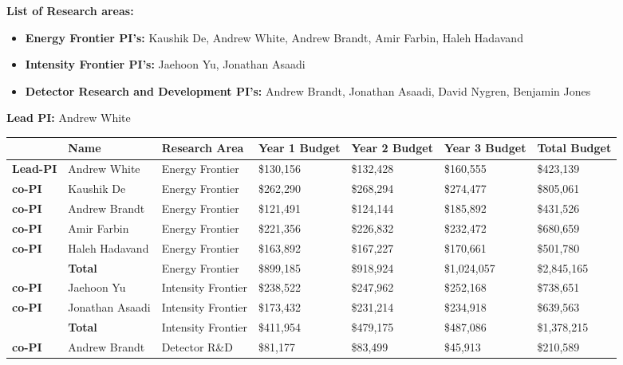 \noindent\textbf{List of Research areas:}
\begin{itemize}[noitemsep,nolistsep]
   \item \textbf{Energy Frontier PI's:} Kaushik De, Andrew White, Andrew Brandt, Amir Farbin, Haleh Hadavand
	\item \textbf{Intensity Frontier PI's:} Jaehoon Yu, Jonathan Asaadi
	\item \textbf{Detector Research and Development PI's:} Andrew Brandt, Jonathan Asaadi, David Nygren, Benjamin Jones
\end{itemize}

\noindent\textbf{Lead PI:} Andrew White

\begin{table}[htb]
\centering
\begin{tabular}{ || l || l |  p{1.7cm} | p{1.7cm} | p{1.7cm} || p{1.7cm} | p{1.8cm} || }
\hline\hline\hline
 & \textbf{Name} & \textbf{Research Area} & \textbf{Year 1 Budget} & \textbf{Year 2 Budget} & \textbf{Year 3 Budget} & \textbf{Total Budget} \\ \hline\hline
\textbf{Lead-PI} & Andrew White & Energy Frontier & \$130,156 & \$132,428 & \$160,555 & \$423,139 \\ \hline
\textbf{co-PI} & Kaushik De & Energy Frontier & \$262,290 & \$268,294 & \$274,477 & \$805,061  \\ \hline
\textbf{co-PI} & Andrew Brandt & Energy Frontier & \$121,491 & \$124,144 & \$185,892 & \$431,526 \\ \hline
\textbf{co-PI} & Amir Farbin & Energy Frontier & \$221,356 & \$226,832 & \$232,472 & \$680,659 \\ \hline
\textbf{co-PI} & Haleh Hadavand & Energy Frontier & \$163,892 & \$167,227 & \$170,661 & \$501,780 \\ \hline\hline
 & \textbf{Total} & Energy Frontier & \$899,185 & \$918,924 & \$1,024,057 & \$2,845,165 \\ \hline\hline
\textbf{co-PI} & Jaehoon Yu & Intensity Frontier & \$238,522 & \$247,962 & \$252,168 & \$738,651 \\ \hline
\textbf{co-PI} & Jonathan Asaadi & Intensity Frontier & \$173,432 & \$231,214 & \$234,918 & \$639,563 \\ \hline\hline
 & \textbf{Total} & Intensity Frontier & \$411,954 & \$479,175 & \$487,086 & \$1,378,215 \\ \hline\hline
\textbf{co-PI} & Andrew Brandt & Detector R\&D & \$81,177 & \$83,499 & \$45,913 & \$210,589 \\ \hline\hline

\end{tabular}
\end{table}
